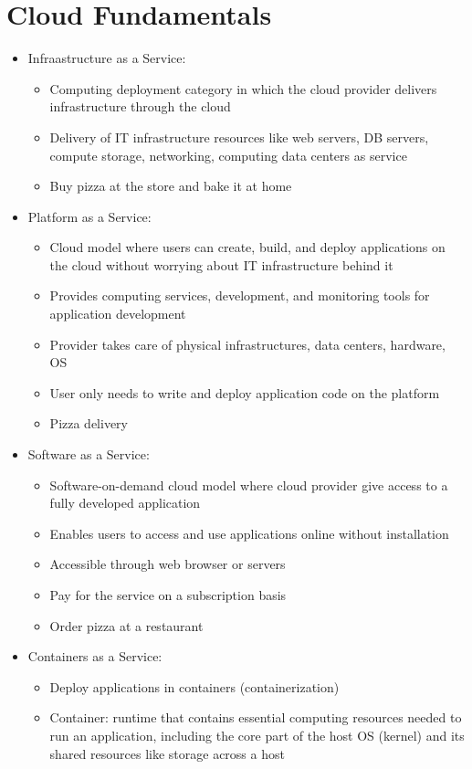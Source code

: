 \documentclass[11pt]{scrartcl}
\begin{document}
\section*{Cloud Fundamentals}
\begin{itemize}
	\item Infraastructure as a Service:
	\begin{itemize}
		\item Computing deployment category in which the cloud provider delivers infrastructure through the cloud
		\item Delivery of IT infrastructure resources like web servers, DB servers, compute storage, networking, computing data centers as service
		\item Buy pizza at the store and bake it at home
	\end{itemize}
	\item Platform as a Service:
	\begin{itemize}
		\item Cloud model where users can create, build, and deploy applications on the cloud without worrying about IT infrastructure behind it
		\item Provides computing services, development, and monitoring tools for application development
		\item Provider takes care of physical infrastructures, data centers, hardware, OS
		\item User only needs to write and deploy application code on the platform
		\item Pizza delivery
	\end{itemize}
	\item Software as a Service:
	\begin{itemize}
		\item Software-on-demand cloud model where cloud provider give access to a fully developed application
		\item Enables users to access and use applications online without installation
		\item Accessible through web browser or servers
		\item Pay for the service on a subscription basis
		\item Order pizza at a restaurant
	\end{itemize}
	\item Containers as a Service:
	\begin{itemize}
		\item Deploy applications in  containers (containerization)
		\item Container: runtime that contains essential computing resources needed to run an application, including the core part of the host OS (kernel) and its shared resources like storage across a host

\end{itemize}
\end{itemize}
\end{document}
